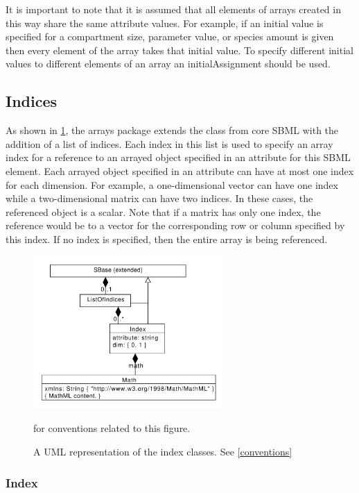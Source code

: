 It is important to note that it is assumed that all elements of arrays created in this way share the same attribute values.  For example, if an initial value is specified for a compartment size, parameter value, or species amount is given then every element of the array takes that initial value.  To specify different initial values to different elements of an array an initialAssignment should be used. 

\subsection{Indices}

As shown in \ref{fig:indices_uml}, the arrays package extends the \SBase class from core SBML with the addition of a list of indices.  Each index in this list is used to specify an array index for a reference to an arrayed object specified in an attribute for this SBML element.    Each arrayed object specified in an attribute can have at most one index for each dimension.  For example, a one-dimensional vector can have one index while a two-dimensional matrix can have two indices.  In these cases, the referenced object is a scalar.  Note that if a matrix has only one index, the reference would be to a vector for the corresponding row or column specified by this index.  If no index is specified, then the entire array is being referenced.  

\begin{figure}[tbhp]
  \centering
  \includegraphics[width=0.65\textwidth]{images/indicesUML.pdf}\\
  \caption{A UML representation of the index classes. See \ref{conventions}} for conventions related to this figure. \label{fig:indices_uml}
\end{figure}

\subsubsection{Index}
\label{sec:index}

